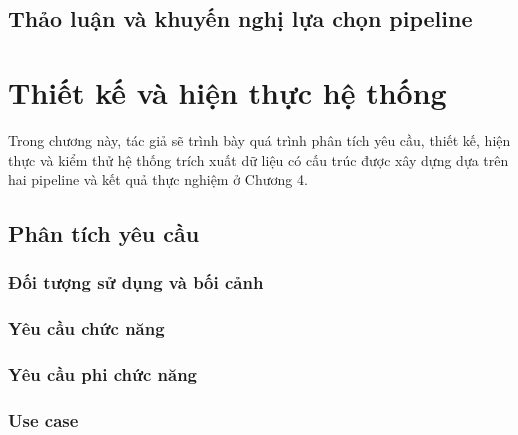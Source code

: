 ﻿\documentclass[12pt]{report}
\begin{document}
\section{Thảo luận và khuyến nghị lựa chọn pipeline}\label{sec:pipeline_recommendation}


\clearpage

\chapter{Thiết kế và hiện thực hệ thống}\label{sec:system_design}

Trong chương này, tác giả sẽ trình bày quá trình phân tích yêu cầu, thiết kế, hiện thực và kiểm thử hệ thống trích xuất dữ liệu có cấu trúc được xây dựng dựa trên hai pipeline và kết quả thực nghiệm ở Chương 4.

\section{Phân tích yêu cầu}\label{sec:sys_requirements}

\subsection{Đối tượng sử dụng và bối cảnh}

\subsection{Yêu cầu chức năng}

\subsection{Yêu cầu phi chức năng}

\subsection{Use case}
\end{document}
